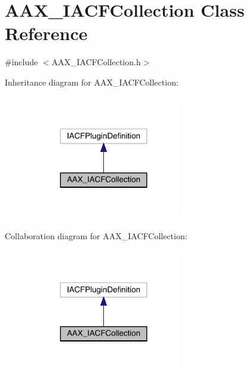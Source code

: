 \hypertarget{a01621}{}\section{A\+A\+X\+\_\+\+I\+A\+C\+F\+Collection Class Reference}
\label{a01621}


{\ttfamily \#include $<$A\+A\+X\+\_\+\+I\+A\+C\+F\+Collection.\+h$>$}



Inheritance diagram for A\+A\+X\+\_\+\+I\+A\+C\+F\+Collection\+:
\nopagebreak
\begin{figure}[H]
\begin{center}
\leavevmode
\includegraphics[width=188pt]{a01620}
\end{center}
\end{figure}


Collaboration diagram for A\+A\+X\+\_\+\+I\+A\+C\+F\+Collection\+:
\nopagebreak
\begin{figure}[H]
\begin{center}
\leavevmode
\includegraphics[width=188pt]{a01619}
\end{center}
\end{figure}


